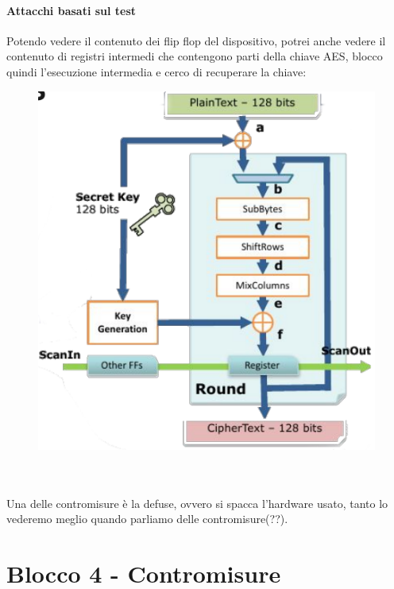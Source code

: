 \documentclass[oneside, 12pt]{extbook}
\begin{document}
\subsubsection{Attacchi basati sul test}
Potendo vedere il contenuto dei flip flop del dispositivo, potrei anche vedere il contenuto di registri intermedi che contengono parti della chiave AES, blocco quindi l'esecuzione intermedia e cerco di recuperare la chiave:\\
\begin{figure}[!h]
	\includegraphics[scale=0.6]{immagini/hardware/rsa_key.png}
\end{figure}
\\\\Una delle contromisure è la defuse, ovvero si spacca l'hardware usato, tanto lo vederemo meglio quando parliamo delle contromisure(??).


\chapter{Blocco 4 - Contromisure}
\end{document}

